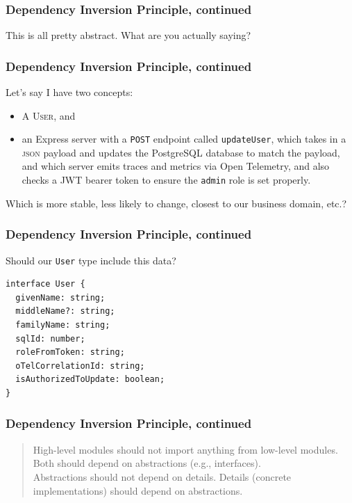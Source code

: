 \documentclass[aspectratio=169]{beamer}
\begin{document}
\begin{frame}
  \frametitle{Dependency Inversion Principle, continued}

  This is all pretty abstract. What are you actually saying?
\end{frame}

\begin{frame}
  \frametitle{Dependency Inversion Principle, continued}

  Let's say I have two concepts:

  \begin{itemize}
    \item A \textsc{User}, and
    \item an Express server with a \texttt{POST} endpoint called
          \texttt{updateUser}, which takes in a \textsc{json} payload and
          updates the PostgreSQL database to match the payload, and which server
          emits traces and metrics via Open Telemetry, and also checks a JWT
          bearer token to ensure the \texttt{admin} role is set properly.
  \end{itemize}

  \vspace{1em}

  Which is more stable, less likely to change, closest to our business domain,
  etc.?
\end{frame}

\begin{frame}[fragile]
  \frametitle{Dependency Inversion Principle, continued}
  Should our \texttt{User} type include this data?
  \vspace{1em}
  \begin{verbatim}
interface User {
  givenName: string;
  middleName?: string;
  familyName: string;
  sqlId: number;
  roleFromToken: string;
  oTelCorrelationId: string;
  isAuthorizedToUpdate: boolean;
}
  \end{verbatim}
\end{frame}


\begin{frame}
  \frametitle{Dependency Inversion Principle, continued}
  \begin{quote}
    High-level modules should not import anything from low-level modules. Both
    should depend on abstractions (e.g., interfaces).
    \vspace{1em}
    \\
    Abstractions should not depend on details. Details (concrete
    implementations) should depend on abstractions.
  \end{quote}
\end{frame}
\end{document}
